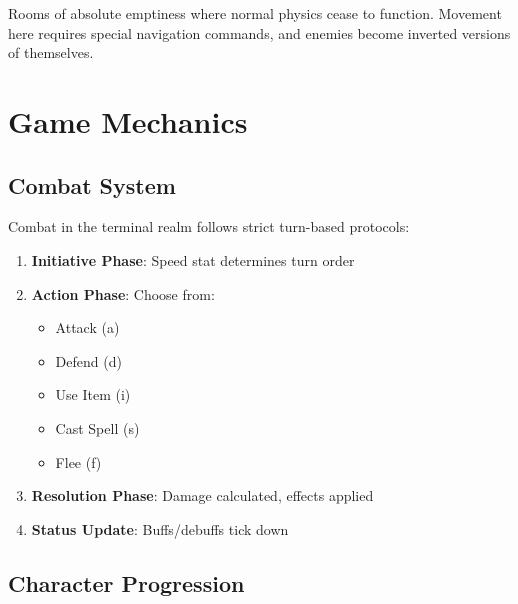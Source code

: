 \documentclass[11pt,a4paper]{book}
\begin{document}
Rooms of absolute emptiness where normal physics cease to function. Movement here requires special navigation commands, and enemies become inverted versions of themselves.

\chapter{Game Mechanics}

\section{Combat System}

\begin{mechanicsbox}
Combat in the terminal realm follows strict turn-based protocols:

\begin{enumerate}
    \item \textbf{Initiative Phase}: Speed stat determines turn order
    \item \textbf{Action Phase}: Choose from:
    \begin{itemize}
        \item Attack (a)
        \item Defend (d)
        \item Use Item (i)
        \item Cast Spell (s)
        \item Flee (f)
    \end{itemize}
    \item \textbf{Resolution Phase}: Damage calculated, effects applied
    \item \textbf{Status Update}: Buffs/debuffs tick down
\end{enumerate}
\end{mechanicsbox}

\section{Character Progression}
\end{document}
